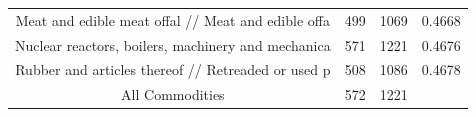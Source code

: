 \documentclass[10pt,]{article}
\begin{document}
\begin{longtable}[]{@{}cccc@{}}
\begin{minipage}[t]{0.38\columnwidth}
Meat and edible meat offal // Meat and edible offa\strut
\end{minipage} & \begin{minipage}[t]{0.21\columnwidth}\centering\strut
499\strut
\end{minipage} & \begin{minipage}[t]{0.20\columnwidth}\centering\strut
1069\strut
\end{minipage} & \begin{minipage}[t]{0.09\columnwidth}\centering\strut
0.4668\strut
\end{minipage}\tabularnewline
\begin{minipage}[t]{0.38\columnwidth}\centering\strut
Nuclear reactors, boilers, machinery and mechanica\strut
\end{minipage} & \begin{minipage}[t]{0.21\columnwidth}\centering\strut
571\strut
\end{minipage} & \begin{minipage}[t]{0.20\columnwidth}\centering\strut
1221\strut
\end{minipage} & \begin{minipage}[t]{0.09\columnwidth}\centering\strut
0.4676\strut
\end{minipage}\tabularnewline
\begin{minipage}[t]{0.38\columnwidth}\centering\strut
Rubber and articles thereof // Retreaded or used p\strut
\end{minipage} & \begin{minipage}[t]{0.21\columnwidth}\centering\strut
508\strut
\end{minipage} & \begin{minipage}[t]{0.20\columnwidth}\centering\strut
1086\strut
\end{minipage} & \begin{minipage}[t]{0.09\columnwidth}\centering\strut
0.4678\strut
\end{minipage}\tabularnewline
\begin{minipage}[t]{0.38\columnwidth}\centering\strut
All Commodities\strut
\end{minipage} & \begin{minipage}[t]{0.21\columnwidth}\centering\strut
572\strut
\end{minipage} & \begin{minipage}[t]{0.20\columnwidth}\centering\strut
1221\strut
\end{minipage} & \begin{minipage}[t]{0.09\columnwidth}\centering\strut

\end{minipage}
\end{longtable}
\end{document}
